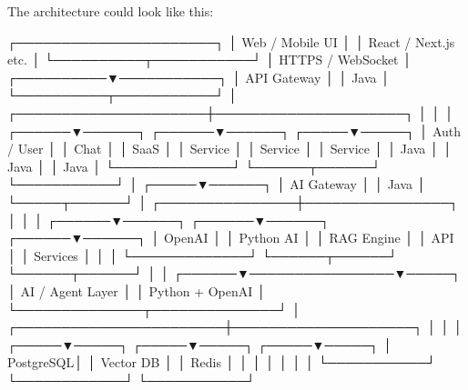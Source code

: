 
The architecture could look like this:

                         ┌──────────────────────┐
                         │   Web / Mobile UI    │
                         │ React / Next.js etc. │
                         └──────────┬───────────┘
                                    │
                              HTTPS / WebSocket
                                    │
                         ┌──────────▼───────────┐
                         │      API Gateway     │
                         │       Java           │
                         └──────────┬───────────┘
                                    │
              ┌─────────────────────┼─────────────────────┐
              │                     │                     │
       ┌──────▼──────┐       ┌──────▼──────┐       ┌─────▼─────┐
       │ Auth / User │       │   Chat      │       │   SaaS    │
       │   Service   │       │   Service   │       │  Service  │
       │    Java     │       │    Java     │       │   Java    │
       └─────────────┘       └──────┬──────┘       └───────────┘
                                    │
                              ┌─────▼──────┐
                              │ AI Gateway │
                              │    Java    │
                              └─────┬──────┘
                                    │
                    ┌───────────────┼────────────────┐
                    │               │                │
             ┌──────▼──────┐ ┌──────▼──────┐ ┌──────▼──────┐
             │ OpenAI      │ │ Python AI   │ │ RAG Engine  │
             │ API         │ │ Services    │ │             │
             └─────────────┘ └──────┬──────┘ └──────┬──────┘
                                    │                │
                             ┌──────▼────────────────▼─────┐
                             │       AI / Agent Layer      │
                             │ Python + OpenAI             │
                             └──────────────┬──────────────┘
                                            │
                    ┌───────────────────────┼────────────────────┐
                    │                       │                    │
              ┌─────▼─────┐          ┌─────▼─────┐       ┌─────▼─────┐
              │ PostgreSQL│          │ Vector DB  │       │   Redis   │
              │           │          │            │       │           │
              └───────────┘          └────────────┘       └───────────┘


